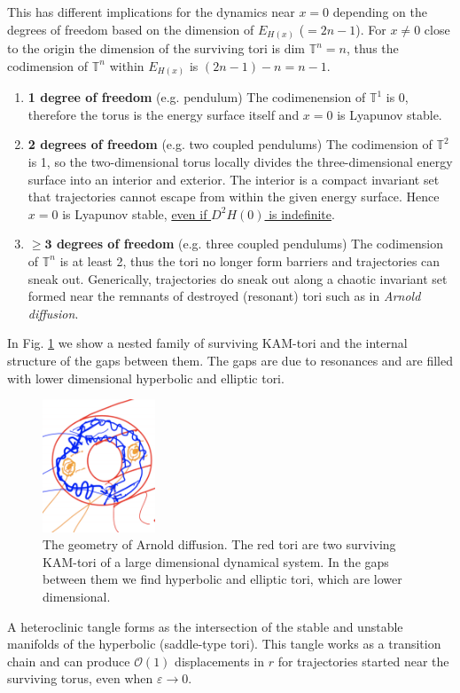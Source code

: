 This has different implications for the dynamics near $x=0$ depending on the degrees of freedom based on the dimension of $E_{H(x)}$ ($=2n-1$). For $x\neq 0$ close to the origin the dimension of the surviving tori is $ \textrm{dim }\mathbb{T}^{n}=n$, thus the codimension of $\mathbb{T}^{n}$ within $E_{H(x)}$ is $(2n-1)-n = n-1$.
\begin{enumerate}
	\item  \textbf{1 degree of freedom} (e.g. pendulum) The codimenension of $\mathbb{T}^{1}$ is 0, therefore the torus is the energy surface itself and $x=0$ is Lyapunov stable. 
	\item \textbf{2 degrees of freedom} (e.g. two coupled pendulums) The codimension of $\mathbb{T}^{2}$ is 1, so the two-dimensional torus locally divides the three-dimensional energy surface into an interior and exterior. The interior is a compact invariant set that trajectories cannot escape from within the given energy surface. Hence $x=0$ is Lyapunov stable, \underline{even if $D^{2}H(0)$ is indefinite}.
	\item \textbf{$\bm{\geq 3}$ degrees of freedom} (e.g. three coupled pendulums) The codimension of $\mathbb{T}^{n}$ is at least 2, thus the tori no longer form barriers and trajectories can sneak out. Generically, trajectories do sneak out along a chaotic invariant set formed near the remnants of destroyed (resonant) tori such as in \emph{Arnold diffusion}.
\end{enumerate}

In Fig. \ref{fig:arnold-diffusion} we show a nested family of surviving KAM-tori and the internal structure of the gaps between them. The gaps are due to resonances and are filled with lower dimensional hyperbolic and elliptic tori. 
\begin{figure}[h!]
	\centering
	\includegraphics[width=0.3\textwidth]{figures/ch8/22arnold_diffusion.png}
	\caption{The geometry of Arnold diffusion. The red tori are two surviving KAM-tori of a large dimensional dynamical system. In the gaps between them we find hyperbolic and elliptic tori, which  are lower dimensional. }
	\label{fig:arnold-diffusion}
\end{figure}
A heteroclinic tangle forms as the intersection of the stable and unstable manifolds of the hyperbolic (saddle-type tori). This tangle works as a transition chain and can produce $\mathcal{O}(1)$ displacements in $r$ for trajectories started near the surviving torus, even when $\varepsilon \to 0$. 

